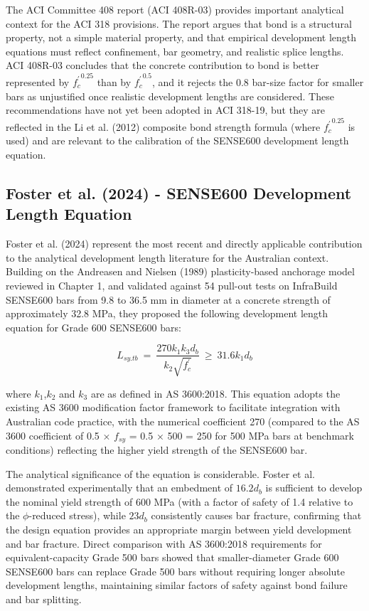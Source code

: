 The ACI Committee 408 report (ACI 408R-03) provides important analytical context for the ACI 318 provisions. The report argues that bond is a structural property, not a simple material property, and that empirical development length equations must reflect confinement, bar geometry, and realistic splice lengths. ACI 408R-03 concludes that the concrete contribution to bond is better represented by ${f_{c}^{\prime }}^{0.25}$ than by ${f_{c}^{\prime }}^{0.5}$, and it rejects the 0.8 bar-size factor for smaller bars as unjustified once realistic development lengths are considered. These recommendations have not yet been adopted in ACI 318-19, but they are reflected in the Li et al. (2012) composite bond strength formula (where ${f_{c}^{\prime }}^{0.25}$ is used) and are relevant to the calibration of the SENSE600 development length equation.

\subsection{Foster et al. (2024) - SENSE600 Development Length Equation}

Foster et al. (2024) represent the most recent and directly applicable contribution to the analytical development length literature for the Australian context. Building on the Andreasen and Nielsen (1989) plasticity-based anchorage model reviewed in Chapter 1, and validated against 54 pull-out tests on InfraBuild SENSE600 bars from 9.8 to 36.5 mm in diameter at a concrete strength of approximately 32.8 MPa, they proposed the following development length equation for Grade 600 SENSE600 bars:

\begin{equation}
L_{sy.tb}\ =\ \frac{270 k_{1} k_{3} d_{b}}{k_{2} \sqrt{f_{c}^{\prime }}}\ \geq \ 31.6 k_{1}d_{b}
\end{equation}

where $k_{1}$,$k_{2}$ and $k_{3}$ are as defined in AS 3600:2018. This equation adopts the existing AS 3600 modification factor framework to facilitate integration with Australian code practice, with the numerical coefficient 270 (compared to the AS 3600 coefficient of 0.5 × $f_{sy}$ = 0.5 × 500 = 250 for 500 MPa bars at benchmark conditions) reflecting the higher yield strength of the SENSE600 bar.

The analytical significance of the equation is considerable. Foster et al. demonstrated experimentally that an embedment of $16.2d_{b}$ is sufficient to develop the nominal yield strength of 600 MPa (with a factor of safety of 1.4 relative to the $\phi$-reduced stress), while $23d_{b}$ consistently causes bar fracture, confirming that the design equation provides an appropriate margin between yield development and bar fracture. Direct comparison with AS 3600:2018 requirements for equivalent-capacity Grade 500 bars showed that smaller-diameter Grade 600 SENSE600 bars can replace Grade 500 bars without requiring longer absolute development lengths, maintaining similar factors of safety against bond failure and bar splitting.

